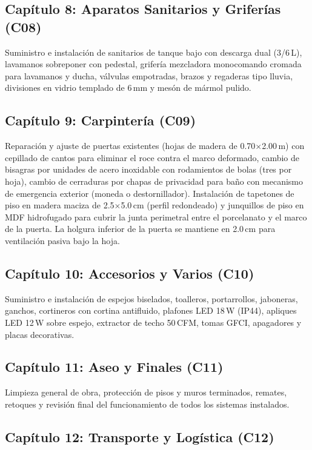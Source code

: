 ﻿\documentclass[12pt]{article}
\begin{document}
\subsection{Capítulo 8: Aparatos Sanitarios y Griferías (C08)}

Suministro e instalación de sanitarios de tanque bajo con descarga dual (3/6\,L), lavamanos sobreponer
con pedestal, grifería mezcladora monocomando cromada para lavamanos y ducha, válvulas empotradas,
brazos y regaderas tipo lluvia, divisiones en vidrio templado de 6\,mm y mesón de mármol pulido.

\subsection{Capítulo 9: Carpintería (C09)}

Reparación y ajuste de puertas existentes (hojas de madera de 0.70$\times$2.00\,m)
con cepillado de cantos para eliminar el roce contra el marco deformado,
cambio de bisagras por unidades de acero inoxidable con rodamientos de bolas
(tres por hoja), cambio de cerraduras por chapas de privacidad para baño con
mecanismo de emergencia exterior (moneda o destornillador). Instalación de
tapetones de piso en madera maciza de 2.5$\times$5.0\,cm (perfil redondeado)
y junquillos de piso en MDF hidrofugado para cubrir la junta perimetral entre
el porcelanato y el marco de la puerta. La holgura inferior de la puerta se
mantiene en 2.0\,cm para ventilación pasiva bajo la hoja.

\subsection{Capítulo 10: Accesorios y Varios (C10)}

Suministro e instalación de espejos biselados, toalleros, portarrollos, jaboneras, ganchos, cortineros
con cortina antifluido, plafones LED 18\,W (IP44), apliques LED 12\,W sobre espejo, extractor de
techo 50\,CFM, tomas GFCI, apagadores y placas decorativas.

\subsection{Capítulo 11: Aseo y Finales (C11)}

Limpieza general de obra, protección de pisos y muros terminados, remates, retoques y revisión
final del funcionamiento de todos los sistemas instalados.

\subsection{Capítulo 12: Transporte y Logística (C12)}
\end{document}
